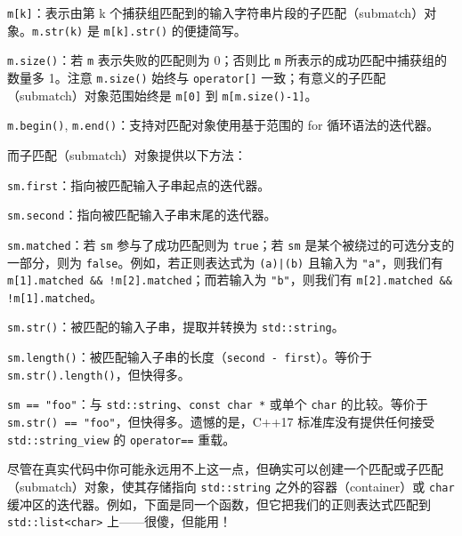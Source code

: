\texttt{m[k]}：表示由第 k 个捕获组匹配到的输入字符串片段的子匹配（submatch）对象。\texttt{m.\allowbreak{}str(\allowbreak{}k)\allowbreak{}} 是 \texttt{m[k].str(\allowbreak{})\allowbreak{}} 的便捷简写。

\texttt{m.\allowbreak{}size(\allowbreak{})\allowbreak{}}：若 \texttt{m} 表示失败的匹配则为 0；否则比 \texttt{m} 所表示的成功匹配中捕获组的数量多 1。注意 \texttt{m.\allowbreak{}size(\allowbreak{})\allowbreak{}} 始终与 \texttt{operator[]} 一致；有意义的子匹配（submatch）对象范围始终是 \texttt{m[0]} 到 \texttt{m[m.\allowbreak{}size(\allowbreak{})\allowbreak{}-1]}。

\texttt{m.\allowbreak{}begin(\allowbreak{})\allowbreak{}}, \texttt{m.\allowbreak{}end(\allowbreak{})\allowbreak{}}：支持对匹配对象使用基于范围的 for 循环语法的迭代器。

而子匹配（submatch）对象提供以下方法：

\texttt{sm.\allowbreak{}first}：指向被匹配输入子串起点的迭代器。

\texttt{sm.\allowbreak{}second}：指向被匹配输入子串末尾的迭代器。

\texttt{sm.\allowbreak{}matched}：若 \texttt{sm} 参与了成功匹配则为 \texttt{true}；若 \texttt{sm} 是某个被绕过的可选分支的一部分，则为 \texttt{false}。例如，若正则表达式为 \texttt{(\allowbreak{}a)\allowbreak{}|(\allowbreak{}b)\allowbreak{}} 且输入为 \texttt{"a"}，则我们有 \texttt{m[1].matched \&\& !m[2].matched}；而若输入为 \texttt{"b"}，则我们有 \texttt{m[2].matched \&\& !m[1].matched}。

\texttt{sm.\allowbreak{}str(\allowbreak{})\allowbreak{}}：被匹配的输入子串，提取并转换为 \texttt{std::\allowbreak{}string}。

\texttt{sm.\allowbreak{}length(\allowbreak{})\allowbreak{}}：被匹配输入子串的长度（\texttt{second - first}）。等价于 \texttt{sm.\allowbreak{}str(\allowbreak{})\allowbreak{}.length(\allowbreak{})\allowbreak{}}，但快得多。

\texttt{sm == "foo"}：与 \texttt{std::\allowbreak{}string}、\texttt{const char *} 或单个 \texttt{char} 的比较。等价于 \texttt{sm.\allowbreak{}str(\allowbreak{})\allowbreak{} == "foo"}，但快得多。遗憾的是，C++17 标准库没有提供任何接受 \texttt{std::\allowbreak{}string\_\allowbreak{}view} 的 \texttt{operator==} 重载。

尽管在真实代码中你可能永远用不上这一点，但确实可以创建一个匹配或子匹配（submatch）对象，使其存储指向 \texttt{std::\allowbreak{}string} 之外的容器（container）或 \texttt{char} 缓冲区的迭代器。例如，下面是同一个函数，但它把我们的正则表达式匹配到 \texttt{std::\allowbreak{}list<\allowbreak{}char>\allowbreak{}} 上——很傻，但能用！

